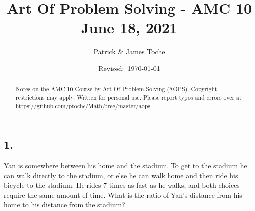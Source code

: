 \documentclass[12pt]{article}
\title{Art Of Problem Solving - AMC 10 \\ June 18, 2021}
\author{Patrick \& James Toche}
\date{Revised:~\today}
\begin{document}
\maketitle
\begin{minipage}{\textwidth}
\begin{abstract}\setlength{\parindent}{0pt}%
Notes on the AMC-10 Course by Art Of Problem Solving (AOPS).
Copyright restrictions may apply. Written for personal use. 
Please report typos and errors over at \url{https://github.com/ptoche/Math/tree/master/aops}. 
\end{abstract}
\end{minipage}

\thispagestyle{empty}
\clearpage


\subsection*{1.}

\nopagebreak

Yan is somewhere between his home and the stadium. To get to the stadium he can walk directly to the stadium, or else he can walk home and then ride his bicycle to the stadium. He rides $7$ times as fast as he walks, and both choices require the same amount of time. What is the ratio of Yan's distance from his home to his distance from the stadium?

\end{document}
